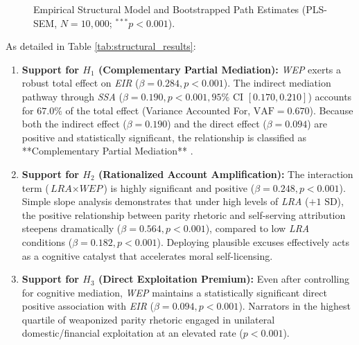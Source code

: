 \begin{figure}[htbp]
\caption{Empirical Structural Model and Bootstrapped Path Estimates (PLS-SEM, $N = 10,000$; $^{***}p < 0.001$).}
\label{fig:structural_model}
\end{figure}

As detailed in Table \ref{tab:structural_results}:
\begin{enumerate}[leftmargin=*]
    \item \textbf{Support for $H_1$ (Complementary Partial Mediation):} \textit{WEP} exerts a robust total effect on \textit{EIR} ($\beta = 0.284, p < 0.001$). The indirect mediation pathway through \textit{SSA} ($\beta = 0.190, p < 0.001, 95\% \text{ CI } [0.170, 0.210]$) accounts for $67.0\%$ of the total effect (Variance Accounted For, $\text{VAF} = 0.670$). Because both the indirect effect ($\beta = 0.190$) and the direct effect ($\beta = 0.094$) are positive and statistically significant, the relationship is classified as **Complementary Partial Mediation** \citep{fritz2025putting}.
    \item \textbf{Support for $H_2$ (Rationalized Account Amplification):} The interaction term ($\textit{LRA} \times \textit{WEP}$) is highly significant and positive ($\beta = 0.248, p < 0.001$). Simple slope analysis demonstrates that under high levels of \textit{LRA} ($+1 \text{ SD}$), the positive relationship between parity rhetoric and self-serving attribution steepens dramatically ($\beta = 0.564, p < 0.001$), compared to low \textit{LRA} conditions ($\beta = 0.182, p < 0.001$). Deploying plausible excuses effectively acts as a cognitive catalyst that accelerates moral self-licensing.
    \item \textbf{Support for $H_3$ (Direct Exploitation Premium):} Even after controlling for cognitive mediation, \textit{WEP} maintains a statistically significant direct positive association with \textit{EIR} ($\beta = 0.094, p < 0.001$). Narrators in the highest quartile of weaponized parity rhetoric engaged in unilateral domestic/financial exploitation at an elevated rate ($p < 0.001$).
\end{enumerate}

